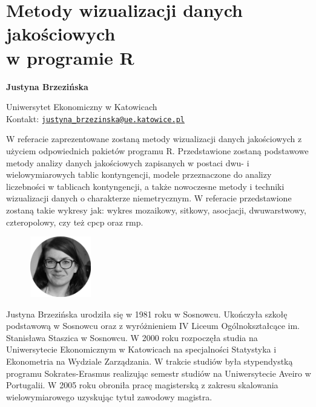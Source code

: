 \documentclass[\main/boa.tex]{subfiles}
\begin{document}
\section[Metody wizualizacji danych jakościowych w programie R]{Metody wizualizacji danych jakościowych \\ w programie R}


\begin{minipage}{0.915\textwidth}
	\centering
  {\bf \LARGE {} Justyna Brzezińska}
\end{minipage}


\begin{affiliations}
\begin{minipage}{0.915\textwidth}
\centering
\large Uniwersytet Ekonomiczny w Katowicach   \\[1pt]
Kontakt: \href{mailto:justyna_brzezinska@ue.katowice.pl}{\nolinkurl{justyna_brzezinska@ue.katowice.pl}}\\
\end{minipage}
\end{affiliations}

W referacie zaprezentowane zostaną metody wizualizacji danych jakościowych z użyciem odpowiednich pakietów programu R. Przedstawione zostaną podstawowe metody analizy danych jakościowych zapisanych w postaci dwu- i wielowymiarowych tablic kontyngencji, modele przeznaczone do analizy liczebności w tablicach kontyngencji, a także nowoczesne metody i techniki wizualizacji danych o charakterze niemetrycznym. W referacie przedstawione zostaną takie wykresy jak: wykres mozaikowy, sitkowy, asocjacji, dwuwarstwowy, czteropolowy, czy też cpcp oraz rmp. 

\bio
\begin{figure}
    \includegraphics[width=100px]{img/guests/czarno_biale/jbrzezinska.png}
\end{figure} 
Justyna Brzezińska urodziła się w 1981 roku w Sosnowcu. Ukończyła szkołę podstawową w Sosnowcu oraz z wyróżnieniem IV Liceum Ogólnokształcące im. Stanisława Staszica w Sosnowcu. W 2000 roku rozpoczęła studia na Uniwersytecie Ekonomicznym w Katowicach na specjalności Statystyka i Ekonometria na Wydziale Zarządzania. W trakcie studiów była stypendystką programu Sokrates-Erasmus realizując semestr studiów na Uniwersytecie Aveiro w Portugalii. W 2005 roku obroniła pracę magisterską z zakresu skalowania wielowymiarowego uzyskując tytuł zawodowy magistra.
\end{document}
